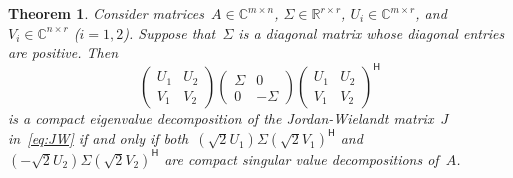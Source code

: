 \documentclass[11pt,a4paper]{article}  %
\numberwithin{equation}{section}
\newtheorem{theorem}{Theorem}%
\theoremstyle{definition}
\def\RR{\mathbb{R}}
\def\CC{\mathbb{C}}
\newcommand{\hmt}{{\scriptscriptstyle{{\mathsf{H}}}}}
\begin{document}
\begin{theorem}
  \label{th:lanczos}
  Consider matrices~$A\in \CC^{m\times n}$, $\Sigma \in \RR^{r\times r}$, $U_i \in
  \CC^{m\times r}$, and $V_i \in \CC^{n\times r}$ \textnormal{(}$i=1,2$\textnormal{)}.
  Suppose that~$\Sigma$ is a diagonal matrix
  whose diagonal entries are positive. Then
  \begin{equation}
    \label{eq:evdJ}
    \begin{pmatrix}
      U_1 & U_2 \\
      V_1 & V_2
    \end{pmatrix}
    \begin{pmatrix}
      \Sigma & 0\\
      0 & -\Sigma
    \end{pmatrix}
    \begin{pmatrix}
      U_1 & U_2 \\
      V_1 & V_2
    \end{pmatrix}^\hmt
  \end{equation}
  is a compact eigenvalue decomposition of the Jordan-Wielandt matrix~$J$ in~\eqref{eq:JW}
  if and only if both~$(\sqrt{2} U_1)\Sigma (\sqrt{2} V_1)^\hmt$ and~$(-\sqrt{2}U_2)\Sigma (\sqrt{2}V_2)^\hmt$ are
  compact singular value decompositions of~$A$.
\end{theorem}
\end{document}
